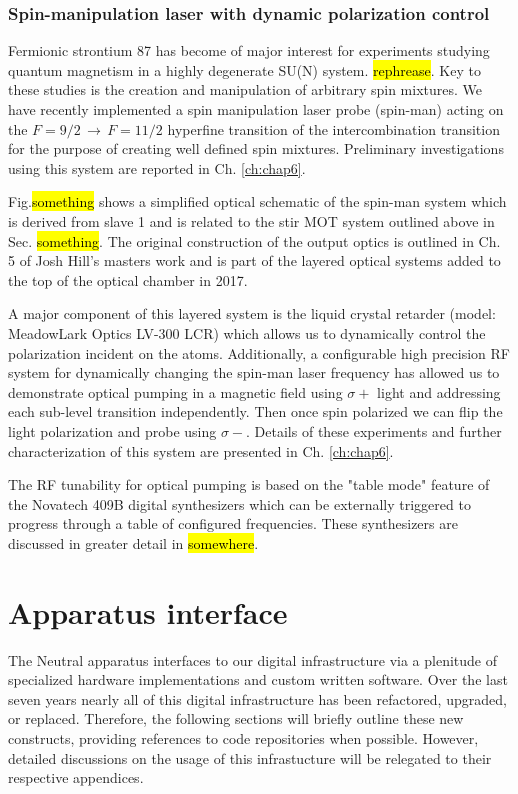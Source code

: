 \subsubsection{Spin-manipulation laser with dynamic polarization control}
Fermionic strontium 87 has become of major interest for experiments studying quantum magnetism in a highly degenerate SU(N) system. \hl{rephrease}.
Key to these studies is the creation and manipulation of arbitrary spin mixtures.
We have recently implemented a spin manipulation laser probe (spin-man) acting on the $F=9/2\,\rightarrow\,F=11/2$ hyperfine transition of the intercombination transition for the purpose of creating well defined spin mixtures.
Preliminary investigations using this system are reported in Ch. \ref{ch:chap6}.

Fig.\hl{something} shows a simplified optical schematic of the spin-man system which is derived from slave 1 and is related to the stir MOT system outlined above in Sec. \hl{something}.
The original construction of the output optics is outlined in Ch. 5 of Josh Hill's masters work \cite{Hill2017} and is part of the layered optical systems added to the top of the optical chamber in 2017.

A major component of this layered system is the liquid crystal retarder (model: MeadowLark Optics LV-300 LCR) which allows us to dynamically control the polarization incident on the atoms.
Additionally, a configurable high precision RF system for dynamically changing the spin-man laser frequency has allowed us to demonstrate optical pumping in a magnetic field using $\sigma+$ light and addressing each sub-level transition independently.
Then once spin polarized we can flip the light polarization and probe using $\sigma-$.
Details of these experiments and further characterization of this system are presented in Ch. \ref{ch:chap6}. 

The RF tunability for optical pumping is based on the "table mode" feature of the Novatech 409B digital synthesizers which can be externally triggered to progress through a table of configured frequencies.
These synthesizers are discussed in greater detail in \hl{somewhere}.

\section{Apparatus interface} \label{sec:electronics}
\setcounter{footnote}{0}
The Neutral apparatus interfaces to our digital infrastructure via a plenitude of specialized hardware implementations and custom written software.
Over the last seven years nearly all of this digital infrastructure has been refactored, upgraded, or replaced.
Therefore, the following sections will briefly outline these new constructs, providing references to code repositories when possible.
However, detailed discussions on the usage of this infrastucture will be relegated to their respective appendices.

